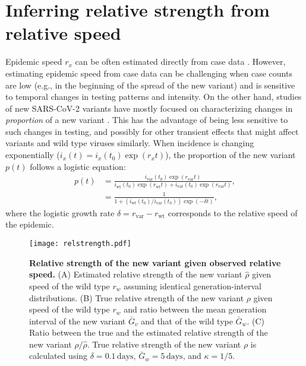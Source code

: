 \documentclass[12pt]{article}
\newcommand{\rx}[1]{\ensuremath{{r}_{#1}}\xspace}
\newcommand{\ry}[1]{\rx{\mathrm{#1}}}
\newcommand{\ix}[1]{\ensuremath{{i}_{#1}}\xspace}
\newcommand{\iy}[1]{\ix{\mathrm{#1}}}
\begin{document}
\section{Inferring relative strength from relative speed}

Epidemic speed $r_x$ can be often estimated directly from case data \citep{mills2004transmissibility,nishiura2009transmission,ma2014estimating}.
However, estimating epidemic speed from case data can be challenging when case counts are low (e.g., in the beginning of the spread of the new variant) and is sensitive to temporal changes in testing patterns and intensity.
On the other hand, studies of new SARS-CoV-2 variants have mostly focused on characterizing changes in \emph{proportion} of a new variant \citep{switzerland2021variant, davies2021estimated, di2021impact, leung2021early, volz2021transmission,zhao2021}.
This has the advantage of being less sensitive to such changes in testing, and possibly for other transient effects that might affect variants and wild type viruses similarly.
When incidence is changing exponentially ($i_x(t) = i_x(t_0) \exp(r_x t)$), the proportion of the new variant $p(t)$ follows a logistic equation:
\begin{align}
p(t) &= \frac{\iy{var}(t_0) \exp(\ry{var} t)}{\iy{wt}(t_0) \exp(\ry{wt} t) + \iy{var}(t_0) \exp(\ry{var} t)},
\\ &= \frac{1}{1 + \left(\iy{wt}(t_0)/\iy{var}(t_0)\right) \exp(-\delta t)},
\end{align}
where the logistic growth rate $\delta = \ry{var} - \ry{wt}$ corresponds to the relative speed of the epidemic.

\begin{figure}[!th]
\texttt{[image: relstrength.pdf]}
\caption{
\textbf{Relative strength of the new variant given observed relative speed.}
(A) Estimated relative strength of the new variant $\hat{\rho}$ given speed of the wild type
$r_w$ assuming identical generation-interval distributions.
(B) True relative strength of the new variant $\rho$ given speed of the wild type $r_w$ and ratio between the mean generation interval of the new variant $\bar{G}_v$ and that of the wild type $\bar{G}_w$.
(C) Ratio between the true and the estimated relative strength of the new variant $\rho/\hat{\rho}$.
True relative strength of the new variant $\rho$ is calculated using $\delta=0.1\,\textrm{days}$, $\bar{G}_w = 5\,\textrm{days}$, and $\kappa = 1/5$.
}
\label{fig:relstrength}
\end{figure}
\end{document}
